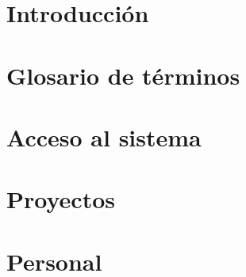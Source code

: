 \documentclass[10pt]{book}
\begin{document}

\thispagestyle{empty}


\frontmatter
\tableofcontents
\listoffigures
\mainmatter

 \hideControlVersion

\chapter{Introducción}\label{chp:introduccion}
\hypertarget{chp:introduccion}{}
\chapter{Glosario de términos}\label{cap:glosario}
\chapter{Acceso al sistema}\label{cap:iniciarSesion}
\chapter{Proyectos}\label{cap:gestionarProyectos}
\chapter{Personal}\label{cap:gestionarPersonal}
\end{document}
